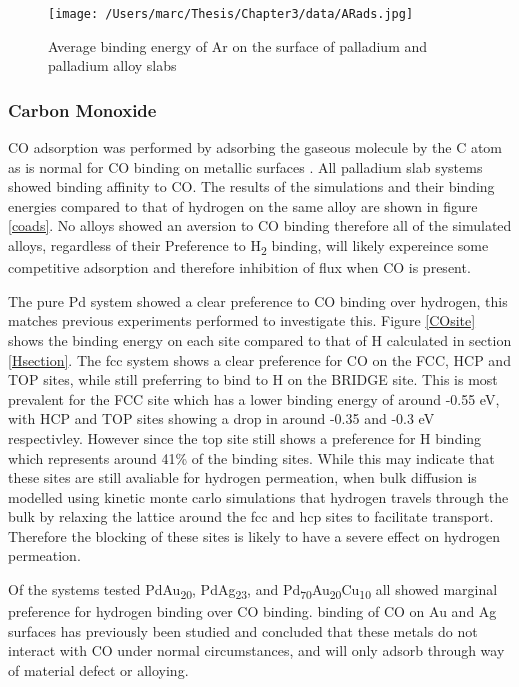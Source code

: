         \begin{figure}
            \centering
            \texttt{[image: /Users/marc/Thesis/Chapter3/data/ARads.jpg]}
            \caption{Average binding energy of Ar on the surface of palladium and palladium alloy slabs}
            \label{Arads}
          \end{figure}
        
\subsubsection{Carbon Monoxide}
CO adsorption was performed by adsorbing the gaseous molecule by the C atom as is normal for CO binding on metallic surfaces \cite{doi:10.1021/acscatal.8b02371}. All palladium slab systems showed binding affinity to CO. The results of the simulations and their binding energies compared to that of hydrogen on the same alloy are shown in figure \ref{coads}.  No alloys showed an aversion to CO binding therefore all of the simulated alloys, regardless of their Preference to H\textsubscript{2} binding, will likely expereince some competitive adsorption and therefore inhibition of flux when CO is present. 

The pure Pd system showed a clear preference to CO binding over hydrogen, this matches previous experiments performed to investigate this. \cite{Xu2016a} Figure \ref{COsite} shows the binding energy on each site compared to that of H calculated in section \ref{Hsection}. The fcc system shows a clear preference for CO on the FCC, HCP and TOP sites, while still preferring to bind to H on the BRIDGE site. This is most prevalent for the FCC site which has a lower binding energy of around -0.55 eV, with HCP and TOP sites showing a drop in around -0.35 and -0.3 eV respectivley. However since the top site still shows a preference for H binding which represents around 41\% of the binding sites. While this may indicate that these sites are still avaliable for hydrogen permeation, when bulk diffusion is modelled using kinetic monte carlo simulations that hydrogen travels through the bulk by relaxing the lattice around the fcc and hcp sites to facilitate transport. \cite{Qin2012} Therefore the blocking of these sites is likely to have a severe effect on hydrogen permeation.

Of the systems tested PdAu\textsubscript{20}, PdAg\textsubscript{23}, and Pd\textsubscript{70}Au\textsubscript{20}Cu\textsubscript{10} all showed marginal preference for hydrogen binding over CO binding. binding of CO on Au and Ag surfaces has previously been studied and concluded that these metals do not interact with CO under normal circumstances, and will only adsorb through way of material defect or alloying. \cite{doi:10.1021/la950167j} \cite{shaikhutdinov_meyer_naschitzki_baumer_freund_2003}

